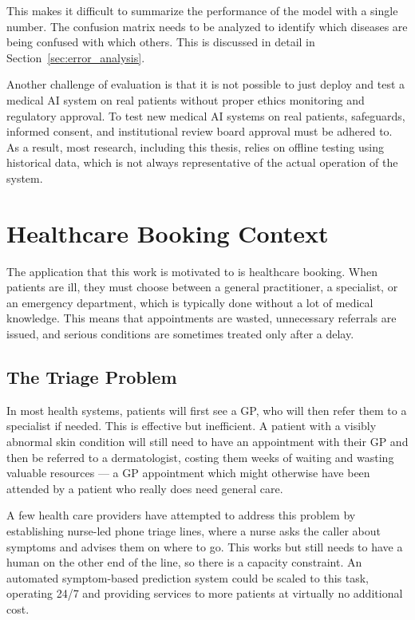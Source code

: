 This makes it difficult to summarize the performance of the model with a single number. The confusion matrix needs to be analyzed to identify which diseases are being confused with which others. This is discussed in detail in Section~\ref{sec:error_analysis}.

Another challenge of evaluation is that it is not possible to just deploy and test a medical AI system on real patients without proper ethics monitoring and regulatory approval. To test new medical AI systems on real patients, safeguards, informed consent, and institutional review board approval must be adhered to. As a result, most research, including this thesis, relies on offline testing using historical data, which is not always representative of the actual operation of the system.

\section{Healthcare Booking Context}
\label{sec:booking_context}

The application that this work is motivated to is healthcare booking. When patients are ill, they must choose between a general practitioner, a specialist, or an emergency department, which is typically done without a lot of medical knowledge. This means that appointments are wasted, unnecessary referrals are issued, and serious conditions are sometimes treated only after a delay.

\subsection{The Triage Problem}

In most health systems, patients will first see a GP, who will then refer them to a specialist if needed. This is effective but inefficient. A patient with a visibly abnormal skin condition will still need to have an appointment with their GP and then be referred to a dermatologist, costing them weeks of waiting and wasting valuable resources --- a GP appointment which might otherwise have been attended by a patient who really does need general care.

A few health care providers have attempted to address this problem by establishing nurse-led phone triage lines, where a nurse asks the caller about symptoms and advises them on where to go. This works but still needs to have a human on the other end of the line, so there is a capacity constraint. An automated symptom-based prediction system could be scaled to this task, operating 24/7 and providing services to more patients at virtually no additional cost.

